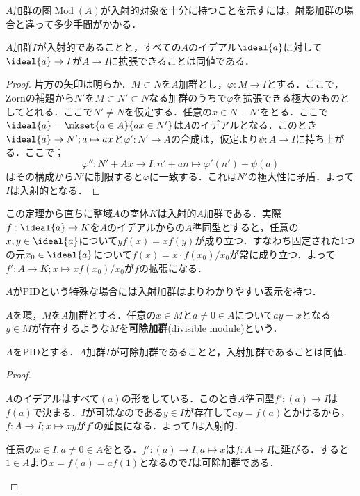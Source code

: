 $A$加群の圏$\operatorname{Mod}(A)$が入射的対象を十分に持つことを示すには，射影加群の場合と違って多少手間がかかる．

\begin{thm}
	$A$加群$I$が入射的であることと，すべての$A$のイデアル$\ideal{a}$に対して$\ideal{a}\to I$が$A\to I$に拡張できることは同値である．
\end{thm}

\begin{proof}
	片方の矢印は明らか．$M\subset N$を$A$加群とし，$\varphi:M\to I$とする．ここで，Zornの補題から$N'$を$M\subset N'\subset N$なる加群のうちで$\varphi$を拡張できる極大のものとしてとれる．ここで$N'\neq N$を仮定する．任意の$x\in N-N'$をとる．ここで$\ideal{a}=\mkset{a\in A}{ax\in N'}$は$A$のイデアルとなる．このとき$\ideal{a}\to N';a\mapsto ax$と$\varphi':N'\to A$の合成は，仮定より$\psi:A\to I$に持ち上がる．ここで；
	\[\varphi'':N'+Ax\to I:n'+an\mapsto \varphi'(n')+\psi(a)\]
	はその構成から$N'$に制限すると$\varphi$に一致する．これは$N'$の極大性に矛盾．よって$I$は入射的となる． 
\end{proof}

この定理から直ちに整域$A$の商体$K$は入射的$A$加群である．実際$f:\ideal{a}\to K$を$A$のイデアルからの$A$準同型とすると，任意の$x,y\in \ideal{a}$について$yf(x)=xf(y)$が成り立つ．すなわち固定された1つの元$x_0\in \ideal{a}$について$f(x)=x\cdot f(x_0)/x_0$が常に成り立つ．よって$f':A\to K;x\mapsto xf(x_0)/x_0$が$f$の拡張になる．

$A$がPIDという特殊な場合には入射加群はよりわかりやすい表示を持つ．
\begin{defi}[可除加群]
	$A$を環，$M$を$A$加群とする．任意の$x\in M$と$a\neq0\in A$について$ay=x$となる$y\in M$が存在するような$M$を\textbf{可除加群}(divisible module)という．
\end{defi}

\begin{prop}
	$A$をPIDとする．$A$加群$I$が可除加群であることと，入射加群であることは同値．
\end{prop}

\begin{proof}
	\begin{eqv}
		\item $A$のイデアルはすべて$(a)$の形をしている．このとき$A$準同型$f':(a)\to I$は$f(a)$で決まる．$I$が可除なのである$y\in I$が存在して$ay=f(a)$とかけるから，$f:A\to I;x\mapsto xy$が$f'$の延長になる．よって$I$は入射的．
		
		\item 任意の$x\in I,a\neq0\in A$をとる．$f':(a)\to I;a\mapsto x$は$f:A\to I$に延びる．すると$1\in A$より$x=f(a)=af(1)$となるので$I$は可除加群である．
	\end{eqv}
\end{proof}

